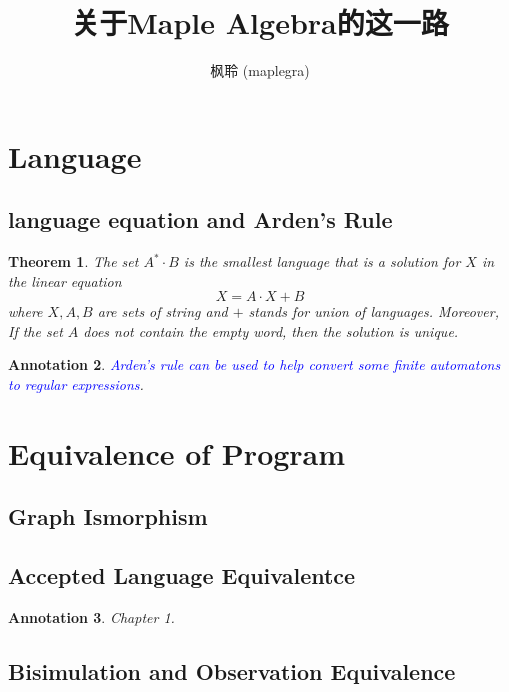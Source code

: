 \documentclass{article}
\newtheorem{theorem}{Theorem}[section]
\newtheorem{annotation}[theorem]{Annotation}
\newcommand{\bluet}[1]{\textcolor{blue}{#1}}
\begin{document}
\title{关于Maple Algebra的这一路}
\author{枫聆 (maplegra)}
\maketitle
\tableofcontents
\newpage

\section{Language}

\subsection{language equation and Arden's Rule}

\begin{theorem}
\rm The set $A^* \cdot B$ is the smallest language that is a solution for $X$ in the linear equation 
\[
	X = A \cdot X + B
\]
where $X, A, B$ are sets of string and $+$ stands for union of languages. Moreover, If the set $A$ does not contain the empty word, then the solution is unique.
\end{theorem}

\begin{annotation}
\rm \bluet{Arden's rule can be used to help convert some finite automatons to regular expressions}.
\end{annotation}

\newpage
\section{Equivalence of Program}

\subsection{Graph Ismorphism}

\subsection{Accepted Language Equivalentce}

\begin{annotation}
\rm \cite{CCS} Chapter 1.
\end{annotation}

\subsection{Bisimulation and Observation Equivalence}
\end{document}
